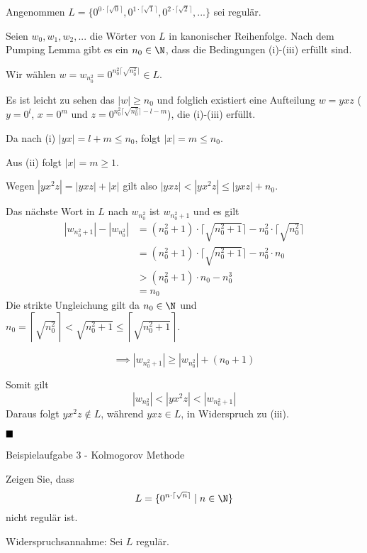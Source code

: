     Angenommen $L = \{0^{0\cdot \lceil \sqrt{0}\rceil}, 0^{1\cdot \lceil \sqrt{1}\rceil}, 0^{2\cdot \lceil \sqrt{2}\rceil}, ...\}$ sei regulär.

    Seien  $w_0, w_1, w_2, ...$ die Wörter von $L$ in kanonischer Reihenfolge. 
    Nach dem Pumping Lemma gibt es ein $n_0 \in \N$, dass die Bedingungen (i)-(iii) erfüllt sind.

    Wir wählen $w = w_{n_0^2} = 0^{n_0^2\lceil\sqrt{n_0^2}\rceil} \in L$. 
    
    Es ist leicht zu sehen das $|w| \geq n_0$ und folglich existiert eine Aufteilung $w = yxz$ ($y = 0^l$, $x = 0^m$ und $z = 0^{n_0^2\lceil\sqrt{n_0^2}\rceil-l-m}$), die (i)-(iii) erfüllt. 
    
    Da nach (i) $|yx| = l + m \leq n_0$, folgt $|x| = m \leq n_0$.

    Aus (ii) folgt $|x| = m \geq 1$.

    Wegen $|yx^2z| = |yxz| + |x|$ gilt also $|yxz| < |yx^2z| \leq |yxz| + n_0$.

    Das nächste Wort in $L$ nach $w_{n_0^2}$ ist $w_{n_0^2+1}$ und es gilt
    \begin{align*}
        |w_{n_0^2+1}| - |w_{n_0^2}| &= (n_0^2+1)\cdot \lceil\sqrt{n_0^2 + 1}\rceil - n_0^2 \cdot \lceil\sqrt{n_0^2}\rceil\\
        &= (n_0^2+1)\cdot\lceil\sqrt{n_0^2+1}\rceil - n_0^2 \cdot n_0\\
        &> (n_0^2+1)\cdot n_0 - n_0^3\\
        &= n_0
    \end{align*}
    Die strikte Ungleichung gilt da $n_0 \in \N$ und $n_0 = \left\lceil\sqrt{n_0^2}\right\rceil < \sqrt{n_0^2+1} \leq \left\lceil\sqrt{n_0^2+1}\right\rceil$.

    $$\implies |w_{n_0^2+1}| \geq |w_{n_0^2}| + (n_0 + 1)$$

    Somit gilt 
    $$|w_{n_0^2}| < |yx^2z| < |w_{n_0^2+1}|$$
    Daraus folgt $yx^2z \notin L$, während $yxz \in L$, in Widerspruch zu (iii).

    $\hfill\blacksquare$



    \begin{subbox}{Beispielaufgabe 3 - Kolmogorov Methode}

    Zeigen Sie, dass 
    $$L = \{0^{n\cdot \lceil \sqrt{n}\rceil} \mid n \in \N\}$$ 
    nicht regulär ist.
    \end{subbox}

    Widerspruchsannahme: Sei $L$ regulär.

